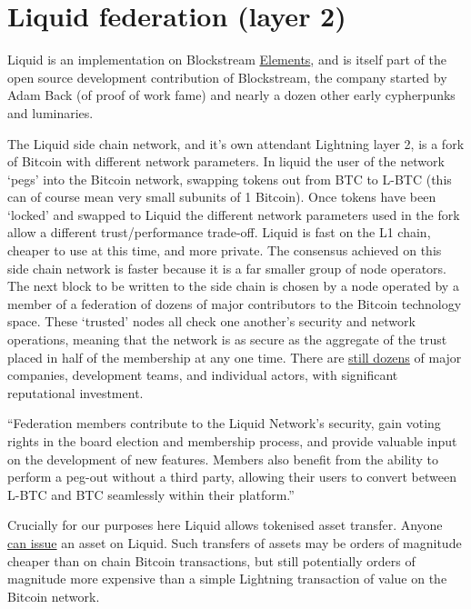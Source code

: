 \section{Liquid federation (layer 2)}
Liquid is an implementation on Blockstream \href{https://elementsproject.org/}{Elements}, and is itself part of the open source development contribution of Blockstream, the company started by Adam Back (of proof of work fame) and nearly a dozen other early cypherpunks and luminaries.\par 
The Liquid side chain network, and it's own attendant Lightning layer 2, is a fork of Bitcoin with different network parameters. In liquid the user of the network `pegs' into the Bitcoin network, swapping tokens out from BTC to L-BTC (this can of course mean very small subunits of 1 Bitcoin). Once tokens have been `locked' and swapped to Liquid the different network parameters used in the fork allow a different trust/performance trade-off. Liquid is fast on the L1 chain, cheaper to use at this time, and more private. The consensus achieved on this side chain network is faster because it is a far smaller group of node operators. The next block to be written to the side chain is chosen by a node operated by a member of a federation of dozens of major contributors to the Bitcoin technology space. These `trusted' nodes all check one another's security and network operations, meaning that the network is as secure as the aggregate of the trust placed in half of the membership at any one time. There are
\href{https://bitcoinmagazine.com/business/bitcoin-liquid-network-gains-six-new-federation-members}{still dozens} of major companies, development teams, and individual actors, with significant reputational investment.\par
``Federation members contribute to the Liquid Network's security, gain voting rights in the board election and membership process, and provide valuable input on the development of new features. Members also benefit from the ability to perform a peg-out without a third party, allowing their users to convert between L-BTC and BTC seamlessly within their platform.''\par
Crucially for our purposes here Liquid allows tokenised asset transfer. Anyone \href{https://docs.blockstream.com/liquid/developer-guide/developer-guide-index.html#issued-assets}{can issue} an asset on Liquid. Such transfers of assets may be orders of magnitude cheaper than on chain Bitcoin transactions, but still potentially orders of magnitude more expensive than a simple Lightning transaction of value on the Bitcoin network. \par 
